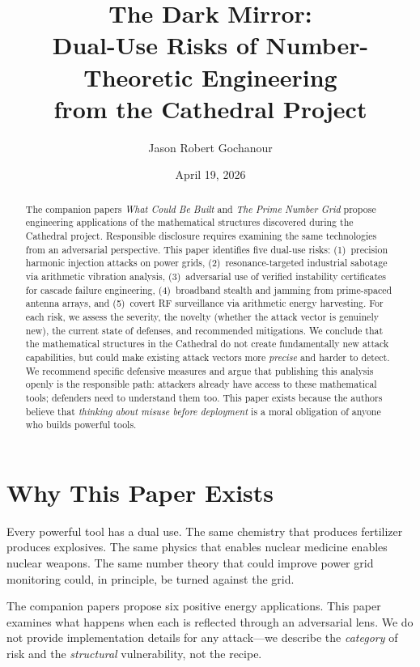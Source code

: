 \documentclass[11pt,a4paper]{article}
\title{%
  The Dark Mirror:\\
  Dual-Use Risks of Number-Theoretic Engineering\\
  from the Cathedral Project%
}
\author{
  Jason Robert Gochanour
}
\date{April 19, 2026}
\begin{document}
\maketitle

\begin{abstract}
The companion papers \emph{What Could Be Built} and \emph{The
Prime Number Grid} propose engineering applications of the
mathematical structures discovered during the Cathedral project.
Responsible disclosure requires examining the same technologies
from an adversarial perspective. This paper identifies five
dual-use risks: (1)~precision harmonic injection attacks on power
grids, (2)~resonance-targeted industrial sabotage via arithmetic
vibration analysis, (3)~adversarial use of verified instability
certificates for cascade failure engineering, (4)~broadband stealth
and jamming from prime-spaced antenna arrays, and (5)~covert RF
surveillance via arithmetic energy harvesting. For each risk, we
assess the severity, the novelty (whether the attack vector is
genuinely new), the current state of defenses, and recommended
mitigations. We conclude that the mathematical structures in the
Cathedral do not create fundamentally new attack capabilities, but
could make existing attack vectors more \emph{precise} and harder
to detect. We recommend specific defensive measures and argue that
publishing this analysis openly is the responsible path: attackers
already have access to these mathematical tools; defenders need to
understand them too. This paper exists because the authors believe
that \emph{thinking about misuse before deployment} is a moral
obligation of anyone who builds powerful tools.
\end{abstract}

\tableofcontents

\section{Why This Paper Exists}

Every powerful tool has a dual use. The same chemistry that produces
fertilizer produces explosives. The same physics that enables
nuclear medicine enables nuclear weapons. The same number theory
that could improve power grid monitoring could, in principle, be
turned against the grid.

The companion papers propose six positive energy applications. This
paper examines what happens when each is reflected through an
adversarial lens. We do not provide implementation details for any
attack---we describe the \emph{category} of risk and the
\emph{structural} vulnerability, not the recipe.
\end{document}
